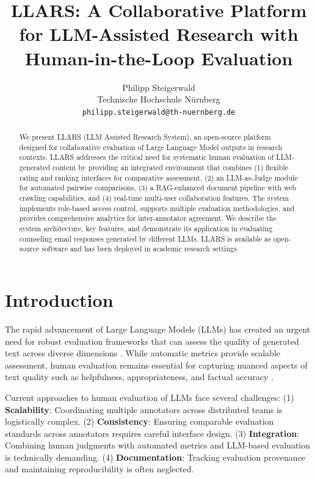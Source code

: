 \documentclass[11pt]{article}
\title{LLARS: A Collaborative Platform for LLM-Assisted Research with Human-in-the-Loop Evaluation}
\author{
  Philipp Steigerwald \\
  Technische Hochschule N\"urnberg \\
  \texttt{philipp.steigerwald@th-nuernberg.de}
}
\begin{document}
\maketitle

\begin{abstract}
We present LLARS (LLM Assisted Research System), an open-source platform designed for collaborative evaluation of Large Language Model outputs in research contexts.
LLARS addresses the critical need for systematic human evaluation of LLM-generated content by providing an integrated environment that combines (1) flexible rating and ranking interfaces for comparative assessment, (2) an LLM-as-Judge module for automated pairwise comparisons, (3) a RAG-enhanced document pipeline with web crawling capabilities, and (4) real-time multi-user collaboration features.
The system implements role-based access control, supports multiple evaluation methodologies, and provides comprehensive analytics for inter-annotator agreement.
We describe the system architecture, key features, and demonstrate its application in evaluating counseling email responses generated by different LLMs.
LLARS is available as open-source software and has been deployed in academic research settings.
\end{abstract}

\section{Introduction}

The rapid advancement of Large Language Models (LLMs) has created an urgent need for robust evaluation frameworks that can assess the quality of generated text across diverse dimensions \cite{chang2024survey}.
While automatic metrics provide scalable assessment, human evaluation remains essential for capturing nuanced aspects of text quality such as helpfulness, appropriateness, and factual accuracy \cite{clark2021all}.

Current approaches to human evaluation of LLMs face several challenges:
(1) \textbf{Scalability}: Coordinating multiple annotators across distributed teams is logistically complex.
(2) \textbf{Consistency}: Ensuring comparable evaluation standards across annotators requires careful interface design.
(3) \textbf{Integration}: Combining human judgments with automated metrics and LLM-based evaluation is technically demanding.
(4) \textbf{Documentation}: Tracking evaluation provenance and maintaining reproducibility is often neglected.
\end{document}
